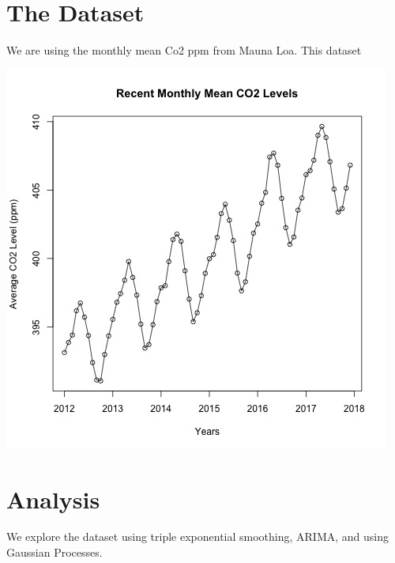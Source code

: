 \documentclass{article}
\begin{document}
\section*{The Dataset}
We are using the monthly mean Co2 ppm from Mauna Loa. This dataset
\begin{center}
\includegraphics[scale = 0.5]{recent.jpg}
\end{center}

\section*{Analysis}
We explore the dataset using triple exponential smoothing, ARIMA, and using Gaussian Processes. 
\subsection*{}
\end{document}
